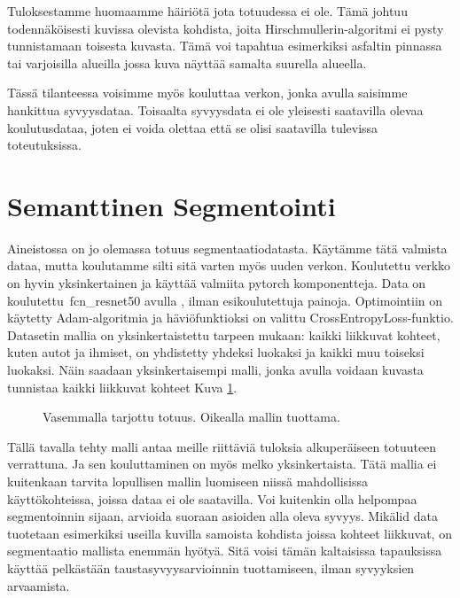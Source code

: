Tuloksestamme huomaamme häiriötä jota totuudessa ei ole.
Tämä johtuu todennäköisesti kuvissa olevista kohdista, joita Hirschmullerin-algoritmi ei pysty tunnistamaan toisesta kuvasta.
Tämä voi tapahtua esimerkiksi asfaltin pinnassa tai varjoisilla alueilla jossa kuva näyttää samalta suurella alueella.

Tässä tilanteessa voisimme myös kouluttaa verkon, jonka avulla saisimme hankittua syvyysdataa.
Toisaalta syvyysdata ei ole yleisesti saatavilla olevaa koulutusdataa,
joten ei voida olettaa että se olisi saatavilla tulevissa toteutuksissa. 

\section{Semanttinen Segmentointi}

Aineistossa on jo olemassa totuus segmentaatiodatasta.
Käytämme tätä valmista dataa, mutta koulutamme silti sitä varten myös uuden verkon.
Koulutettu verkko on hyvin yksinkertainen ja käyttää valmiita pytorch komponentteja.
Data on koulutettu\ fcn\_resnet50 avulla \cite{pytorchfcnresnet50}, ilman esikoulutettuja painoja. Optimointiin on käytetty Adam-algoritmia ja häviöfunktioksi on valittu CrossEntropyLoss-funktio.
Datasetin mallia on yksinkertaistettu tarpeen mukaan: kaikki liikkuvat kohteet, kuten autot ja ihmiset, on yhdistetty yhdeksi luokaksi ja kaikki muu toiseksi luokaksi.
Näin saadaan yksinkertaisempi malli, jonka avulla voidaan kuvasta tunnistaa kaikki liikkuvat kohteet Kuva \ref{fig:segmentation1}.

\begin{figure}[h]
\centering
{}
\caption[Tämä on lyhyt kuvateksti.]{Vasemmalla tarjottu totuus. Oikealla mallin tuottama.}
\label{fig:segmentation1}
\end{figure}
    

Tällä tavalla tehty malli antaa meille riittäviä tuloksia alkuperäiseen totuuteen verrattuna.
Ja sen kouluttaminen on myös melko yksinkertaista.
Tätä mallia ei kuitenkaan tarvita lopullisen mallin luomiseen niissä mahdollisissa käyttökohteissa, joissa dataa ei ole saatavilla.
Voi kuitenkin olla helpompaa segmentoinnin sijaan, arvioida suoraan asioiden alla oleva syvyys.
Mikälid data tuotetaan esimerkiksi useilla kuvilla samoista kohdista joissa kohteet liikkuvat,
on segmentaatio mallista enemmän hyötyä.
Sitä voisi tämän kaltaisissa tapauksissa käyttää pelkästään taustasyvyysarvioinnin tuottamiseen, ilman syvyyksien arvaamista.


